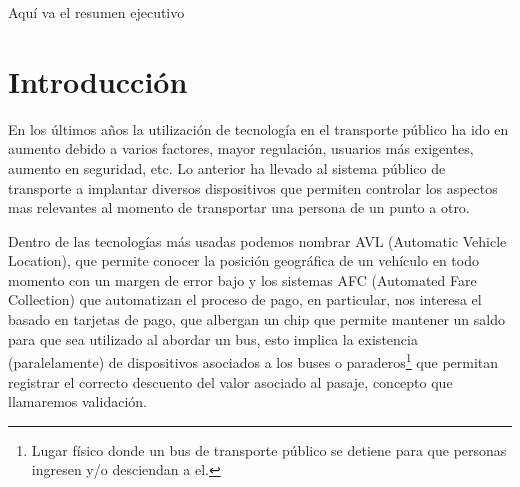 \documentclass[12pt]{article}
\begin{document}
        Aquí va el resumen ejecutivo

        \thispagestyle{empty} %

        \newpage
        \tableofcontents   %



        \newpage



        \newpage
        \section{Introducción}


        En los últimos años la utilización de tecnología en el transporte público ha ido en aumento debido a varios factores, mayor regulación, usuarios más exigentes, aumento en seguridad, etc. Lo anterior ha llevado al sistema público de transporte a implantar diversos dispositivos que permiten controlar los aspectos mas relevantes al momento de transportar una persona de un punto a otro.

        Dentro de las tecnologías más usadas podemos nombrar AVL (Automatic Vehicle Location), que permite conocer la posición geográfica de un vehículo en todo momento con un margen de error bajo y los sistemas AFC (Automated Fare Collection) que automatizan el proceso de pago, en particular, nos interesa el basado en tarjetas de pago, que albergan un chip que permite mantener un saldo para que sea utilizado al abordar un bus, esto implica la existencia (paralelamente) de dispositivos asociados a los buses o paraderos\footnote{Lugar físico donde un bus de transporte público se detiene para que personas ingresen y/o desciendan a el.} que permitan registrar el correcto descuento del valor asociado al pasaje, concepto que llamaremos validación.
\end{document}
